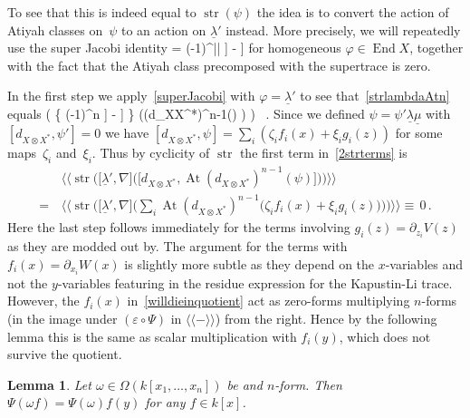 \documentclass{compositio}
\newtheorem{lemma}[theorem]{Lemma}
\theoremstyle{definition}
\numberwithin{equation}{section}
\DeclareMathOperator{\End}{End}
\DeclareMathOperator{\str}{str}
\DeclareMathOperator{\At}{At}
\begin{document}
To see that this is indeed equal to $\str(\psi)$ the idea is to convert the action of Atiyah classes on~$\psi$ to an action on $\underline\lambda'$ instead. More precisely, we will repeatedly use the super Jacobi identity
\be\label{superJacobi}
\big[ \varphi, \At(d_{X\otimes X^*}) \big] = (-1)^{|\varphi|} \big[ d_{X\otimes X^*}, \big[ \varphi, \nabla \big] \big] - \big[ \nabla, \big[ d_{X\otimes X^*}, \varphi \big] \big] 
\ee
for homogeneous $\varphi\in \End X$, together with the fact that the Atiyah class precomposed with the supertrace is zero. 

In the first step we apply~\eqref{superJacobi} with $\varphi=\underline\lambda'$ to see that~\eqref{strlambdaAtn} equals 
\be\label{2strterms}
\Big\langle\!\!\Big\langle \str\Big( \Big\{ (-1)^{n} \big[ d_{X\otimes X^*}, \big[ \underline\lambda', \nabla \big] \big] - \big[ \nabla, \big[ d_{X\otimes X^*}, \underline\lambda' \big] \big] \Big\} \big(\At(d_{X\otimes X^*})^{n-1}(\psi) \big) \Big) \Big\rangle\!\!\Big\rangle \, .
\ee
Since we defined $\psi=\psi'\underline\lambda\underline\mu$ with $[d_{X\otimes X^*}, \psi']=0$ we have $[d_{X\otimes X^*}, \psi]= \sum_i(\zeta_i f_i(x) + \xi_i g_i(z))$ for some maps~$\zeta_i$ and~$\xi_i$. Thus by cyclicity of $\str$ the first term in~\eqref{2strterms} is
\begin{align}
& \, \Big\langle\!\!\Big\langle \str\Big( \big[ \underline\lambda', \nabla \big] \big( \big[ d_{X\otimes X^*}, \At(d_{X\otimes X^*})^{n-1}(\psi) \big] \big) \Big) \Big\rangle\!\!\Big\rangle \nonumber \\
= & \, \Big\langle\!\!\Big\langle \str\Big( \big[ \underline\lambda', \nabla \big] \Big( \sum_i \At(d_{X\otimes X^*})^{n-1}\big( \zeta_i f_i(x) + \xi_i g_i(z)) \Big)\Big) \Big\rangle\!\!\Big\rangle \equiv \, 0 \, . \label{willdieinquotient} 
\end{align}
Here the last step follows immediately for the terms involving $g_i(z)=\partial_{z_i}V(z)$ as they are modded out by. The argument for the terms with $f_i(x) = \partial_{x_i}W(x)$ is slightly more subtle as they depend on the $x$-variables and not the $y$-variables featuring in the residue expression for the Kapustin-Li trace. However, the $f_i(x)$ in~\eqref{willdieinquotient} act as zero-forms multiplying $n$-forms (in the image under $(\varepsilon\circ\Psi)$ in $\langle\!\langle-\rangle\!\rangle$) from the right. Hence by the following lemma this is the same as scalar multiplication with $f_i(y)$, which does not survive the quotient. 

\begin{lemma}
Let $\omega\in\Omega(k[x_1,\ldots,x_n])$ be and $n$-form. Then $\Psi(\omega f)=\Psi(\omega) f(y)$ for any $f\in k[x]$. 
\end{lemma}
\end{document}
